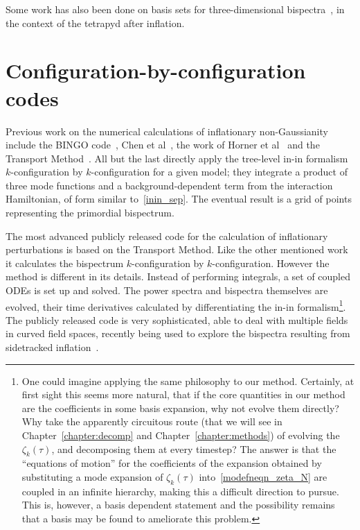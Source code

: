 Some work has also been done on basis sets for three-dimensional
bispectra~\cite{Byun_1, Byun_2, modal_battefeld}, in the context
of the tetrapyd after inflation.


    \section{Configuration-by-configuration codes}
    Previous work on the numerical calculations of inflationary
non-Gaussianity include the BINGO code~\cite{BINGO},
Chen et al~\cite{chen_easther_lim_1,chen_easther_lim_2},
the work of Horner et al~\cite{horner_methods,horner_ng,horner_cs}
and the Transport Method~\cite{transport_main,transport_pytransport,transport_pytransport_2,transport_curved_3_point}.
All but the last directly apply the tree-level in-in formalism $k$-configuration by $k$-configuration for a given model;
they integrate a product of three mode functions and a background-dependent term from the interaction Hamiltonian, of form similar to~\eqref{inin_sep}.
The eventual result is a grid of points representing the primordial bispectrum.


The most advanced publicly released code for the calculation of inflationary perturbations
is based on the Transport Method.
Like the other mentioned work it calculates the bispectrum $k$-configuration by $k$-configuration.
However the method is different in its details.
Instead of performing integrals,
a set of coupled ODEs is set up and solved.
The power spectra and bispectra themselves are evolved, their time derivatives calculated by
differentiating the in-in formalism\footnote{
    One could imagine applying the same philosophy to our method.
    Certainly, at first sight this seems more natural, that if the core
    quantities in our method are the coefficients in some basis expansion,
    why not evolve them directly? Why take the apparently circuitous route
    (that we will see in Chapter~\ref{chapter:decomp} and Chapter~\ref{chapter:methods})
    of evolving the $\zeta_k(\tau)$, and decomposing them at every timestep?
    The answer is that the ``equations of motion'' for the coefficients of the expansion
    obtained by substituting a mode expansion of $\zeta_k(\tau)$ into~\eqref{modefneqn_zeta_N}
    are coupled in an infinite hierarchy, making this a difficult
    direction to pursue. This is, however, a basis dependent statement
    and the possibility remains that a basis may be found to ameliorate this problem.
    }.
The publicly released code is very sophisticated,
able to deal with multiple fields in curved field spaces,
recently being used to explore the bispectra resulting from
sidetracked inflation~\cite{RP_1}.
